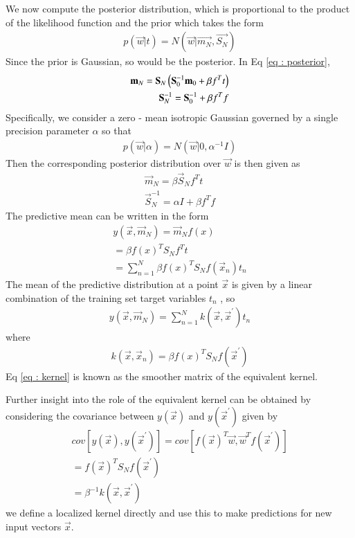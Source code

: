 \documentclass[journal,12pt,twocolumn]{IEEEtran}
\begin{document}
We now compute the posterior distribution, which is proportional to the product of the likelihood function and the prior which takes the form
\begin{align}
    p(\vec{w} | t) = N(\vec{w} | \vec{m_{N}},\vec{S_{N}}) \label{eq : posterior}
\end{align}
Since the prior is Gaussian, so would be the posterior.
In Eq \eqref{eq : posterior},
\begin{align}
       \mathbf{m}_{N} = \mathbf{S}_{N}\left(\mathbf{S}_{0}^{-1}\mathbf{m}_{0} + \beta f^T t\right)\\
       \mathbf{S}_{N}^{-1} = \mathbf{S}_{0}^{-1} + \beta f^{T} f
\end{align}
Specifically, we consider a zero - mean isotropic Gaussian governed by a single precision parameter $\alpha$ so that
\begin{align}
    p(\vec{w} | \alpha) = N(\vec{w} | 0, \alpha^{-1} I)
\end{align}
Then the corresponding posterior distribution over $\vec{w}$ is then given as
\begin{align}
    \vec{m}_{N} = \beta\vec{S}_{N} f^T t \label{eq : mean}\\
    \vec{S}_{N}^{-1} = \alpha I + \beta f^{T} f
\end{align}
The predictive mean can be written in the form
\begin{multline}
     y(\vec{x},\vec{m}_{N}) = \vec{m}_{N} f(x)\\
        = \beta f(x)^{T} S_{N} f^{T} t \\
        = \sum_{n=1}^{N} \beta f(x)^{T} S_{N} f(\vec{x}_{n}) t_{n}
\end{multline}
The mean of the predictive distribution at a point $\vec{x}$ is given by a linear combination of the training set target variables $t_{n}$ , so
\begin{align}
    y(\vec{x},\vec{m}_{N}) = \sum_{n=1}^{N} k(\vec{x},\vec{x}^{'}) t_{n}
\end{align}
where
\begin{align}
    k(\vec{x},\vec{x}_{n}) = \beta f(x)^{T} S_{N} f(\vec{x}^{'}) \label{eq : kernel}
\end{align}
Eq \eqref{eq : kernel} is known as the smoother matrix of the equivalent kernel.

Further insight into the role of the equivalent kernel can be obtained by considering the covariance between $y(\vec{x})$ and $y(\vec{x}^{'})$ given by
\begin{align}
    cov[y(\vec{x}),y(\vec{x}^{'})] = cov[f(\vec{x})^{T}\vec{w}, \vec{w}^{T}f(\vec{x}^{'})]\\
         = f(\vec{x})^{T} S_{N} f(\vec{x}^{'})\\
         = \beta^{-1}k(\vec{x},\vec{x}^{'})
\end{align}
we define a localized kernel directly and use this to make predictions for new input vectors $\vec{x}$.
\end{document}

